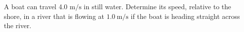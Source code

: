 A boat can travel 4.0 $\mathrm{m}/\mathrm{s}$ in still water. 
Determine its speed, relative to the shore, in a river that is flowing at 
$1.0\ \mathrm{m}/\mathrm{s}$ if the boat is heading straight across the river.